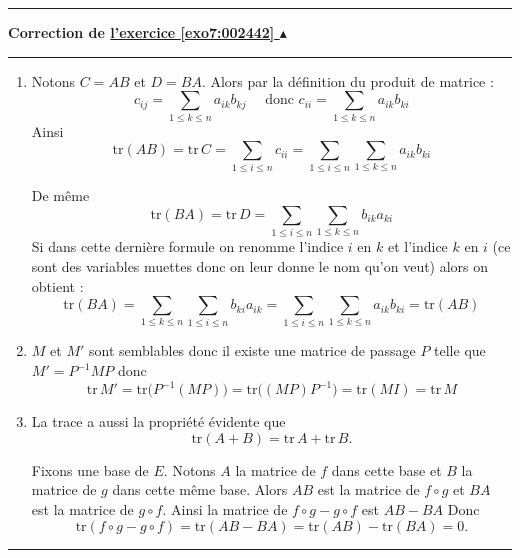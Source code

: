 \documentclass[11pt,a4paper]{article}
\renewcommand{\le}{\leqslant} \renewcommand{\leq}{\leqslant}
\newcounter{exo}
\newcommand{\correction}[1]{\hypertarget{cor7:#1}{}\label{cor7:#1}{\bf Correction de \hyperlink{exo7:#1}{l'exercice \ref{exo7:#1} $\blacktriangle$}}\vspace{1mm}\hrule\vspace{1mm}}
\newcommand{\fincorrection}{\vspace{1mm}\hrule\vspace*{7mm}}
\begin{document}
\fincorrection
\correction{002442}
\begin{enumerate}
  \item Notons $C=AB$ et $D=BA$.
Alors par la définition du produit de matrice :
$$c_{ij}=\sum_{1\le k \le n} a_{ik}b_{kj} \quad \text{ donc } c_{ii}=\sum_{1\le k \le n} a_{ik}b_{ki}$$
Ainsi 
$$\textrm{tr}(AB) = \textrm{tr}\, C = \sum_{1\le i \le n} c_{ii} = \sum_{1\le i \le n} \sum_{1\le k \le n} a_{ik}b_{ki}$$

De même $$\textrm{tr}(BA) = \textrm{tr}\, D = \sum_{1\le i \le n} \sum_{1\le k \le n} b_{ik}a_{ki}$$
Si dans cette dernière formule on renomme l'indice $i$ en $k$ et l'indice $k$ en $i$ (ce sont des variables muettes 
donc on leur donne le nom qu'on veut) alors on obtient :
$$\textrm{tr}(BA) =\sum_{1\le k \le n} \sum_{1\le i \le n} b_{ki}a_{ik} =  \sum_{1\le i \le n}\sum_{1\le k \le n} a_{ik}b_{ki} =\textrm{tr}(AB)$$

  \item $M$ et $M'$ sont semblables donc il existe une matrice de passage $P$ telle que $M'=P^{-1}MP$ donc
$$\textrm{tr}\, M' = \textrm{tr}\big( P^{-1}(MP) \big) = \textrm{tr}\big( (MP)P^{-1} \big) = \textrm{tr} ( M I ) = \textrm{tr}\, M$$

  \item La trace a aussi la propriété évidente que 
$$\textrm{tr}(A+B)=\textrm{tr}\,A+\textrm{tr}\,B.$$

Fixons une base de $E$. Notons $A$ la matrice de $f$ dans cette base et $B$ la matrice de $g$ dans cette même base.
Alors $AB$ est la matrice de $f\circ g$ et $BA$ est la matrice de $g\circ f$.
Ainsi la matrice de $f\circ g - g\circ f$ est $AB-BA$
Donc
$$\textrm{tr}(f\circ g - g\circ f)= \textrm{tr}(AB-BA) = \textrm{tr}(AB)-\textrm{tr}(BA)=0.$$
\end{enumerate}


\fincorrection
\end{document}
